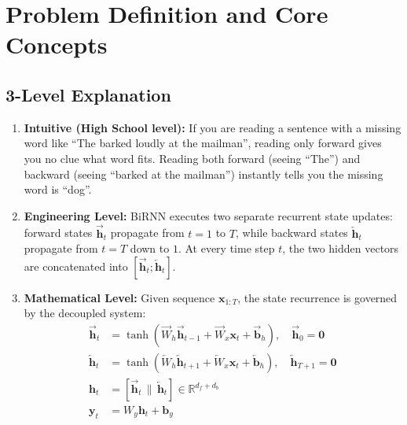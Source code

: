 \documentclass[11pt,a4paper]{article}
\theoremstyle{definition}
\begin{document}
\section{Problem Definition and Core Concepts}

\subsection{3-Level Explanation}
\begin{enumerate}
    \item \textbf{Intuitive (High School level):} If you are reading a sentence with a missing word like ``The \underline{\hspace{1cm}} barked loudly at the mailman'', reading only forward gives you no clue what word fits. Reading both forward (seeing ``The'') and backward (seeing ``barked at the mailman'') instantly tells you the missing word is ``dog''.
    \item \textbf{Engineering Level:} BiRNN executes two separate recurrent state updates: forward states $\overrightarrow{\mathbf{h}}_t$ propagate from $t=1$ to $T$, while backward states $\overleftarrow{\mathbf{h}}_t$ propagate from $t=T$ down to $1$. At every time step $t$, the two hidden vectors are concatenated into $[\overrightarrow{\mathbf{h}}_t; \overleftarrow{\mathbf{h}}_t]$.
    \item \textbf{Mathematical Level:} Given sequence $\mathbf{x}_{1:T}$, the state recurrence is governed by the decoupled system:
    \begin{align}
    \overrightarrow{\mathbf{h}}_t &= \tanh(\overrightarrow{W}_h \overrightarrow{\mathbf{h}}_{t-1} + \overrightarrow{W}_x \mathbf{x}_t + \overrightarrow{\mathbf{b}}_h), \quad \overrightarrow{\mathbf{h}}_0 = \mathbf{0} \\
    \overleftarrow{\mathbf{h}}_t &= \tanh(\overleftarrow{W}_h \overleftarrow{\mathbf{h}}_{t+1} + \overleftarrow{W}_x \mathbf{x}_t + \overleftarrow{\mathbf{b}}_h), \quad \overleftarrow{\mathbf{h}}_{T+1} = \mathbf{0} \\
    \mathbf{h}_t &= [\overrightarrow{\mathbf{h}}_t \,\|\, \overleftarrow{\mathbf{h}}_t] \in \mathbb{R}^{d_f + d_b} \\
    \mathbf{y}_t &= W_y \mathbf{h}_t + \mathbf{b}_y
    \end{align}
\end{enumerate}
\end{document}
